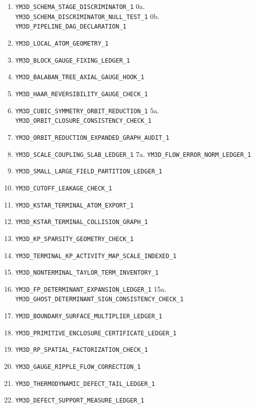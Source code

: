 \documentclass[
]{article}
\providecommand{\tightlist}{%
  \setlength{\itemsep}{0pt}\setlength{\parskip}{0pt}}
\begin{document}
\begin{enumerate}
\def\labelenumi{\arabic{enumi}.}
\setcounter{enumi}{-1}
\tightlist
\item
  \texttt{YM3D\_SCHEMA\_STAGE\_DISCRIMINATOR\_1} 0a.
  \texttt{YM3D\_SCHEMA\_DISCRIMINATOR\_NULL\_TEST\_1} 0b.
  \texttt{YM3D\_PIPELINE\_DAG\_DECLARATION\_1}
\item
  \texttt{YM3D\_LOCAL\_ATOM\_GEOMETRY\_1}
\item
  \texttt{YM3D\_BLOCK\_GAUGE\_FIXING\_LEDGER\_1}
\item
  \texttt{YM3D\_BALABAN\_TREE\_AXIAL\_GAUGE\_HOOK\_1}
\item
  \texttt{YM3D\_HAAR\_REVERSIBILITY\_GAUGE\_CHECK\_1}
\item
  \texttt{YM3D\_CUBIC\_SYMMETRY\_ORBIT\_REDUCTION\_1} 5a.
  \texttt{YM3D\_ORBIT\_CLOSURE\_CONSISTENCY\_CHECK\_1}
\item
  \texttt{YM3D\_ORBIT\_REDUCTION\_EXPANDED\_GRAPH\_AUDIT\_1}
\item
  \texttt{YM3D\_SCALE\_COUPLING\_SLAB\_LEDGER\_1} 7a.
  \texttt{YM3D\_FLOW\_ERROR\_NORM\_LEDGER\_1}
\item
  \texttt{YM3D\_SMALL\_LARGE\_FIELD\_PARTITION\_LEDGER\_1}
\item
  \texttt{YM3D\_CUTOFF\_LEAKAGE\_CHECK\_1}
\item
  \texttt{YM3D\_KSTAR\_TERMINAL\_ATOM\_EXPORT\_1}
\item
  \texttt{YM3D\_KSTAR\_TERMINAL\_COLLISION\_GRAPH\_1}
\item
  \texttt{YM3D\_KP\_SPARSITY\_GEOMETRY\_CHECK\_1}
\item
  \texttt{YM3D\_TERMINAL\_KP\_ACTIVITY\_MAP\_SCALE\_INDEXED\_1}
\item
  \texttt{YM3D\_NONTERMINAL\_TAYLOR\_TERM\_INVENTORY\_1}
\item
  \texttt{YM3D\_FP\_DETERMINANT\_EXPANSION\_LEDGER\_1} 15a.
  \texttt{YM3D\_GHOST\_DETERMINANT\_SIGN\_CONSISTENCY\_CHECK\_1}
\item
  \texttt{YM3D\_BOUNDARY\_SURFACE\_MULTIPLIER\_LEDGER\_1}
\item
  \texttt{YM3D\_PRIMITIVE\_ENCLOSURE\_CERTIFICATE\_LEDGER\_1}
\item
  \texttt{YM3D\_RP\_SPATIAL\_FACTORIZATION\_CHECK\_1}
\item
  \texttt{YM3D\_GAUGE\_RIPPLE\_FLOW\_CORRECTION\_1}
\item
  \texttt{YM3D\_THERMODYNAMIC\_DEFECT\_TAIL\_LEDGER\_1}
\item
  \texttt{YM3D\_DEFECT\_SUPPORT\_MEASURE\_LEDGER\_1}

\end{enumerate}
\end{document}
